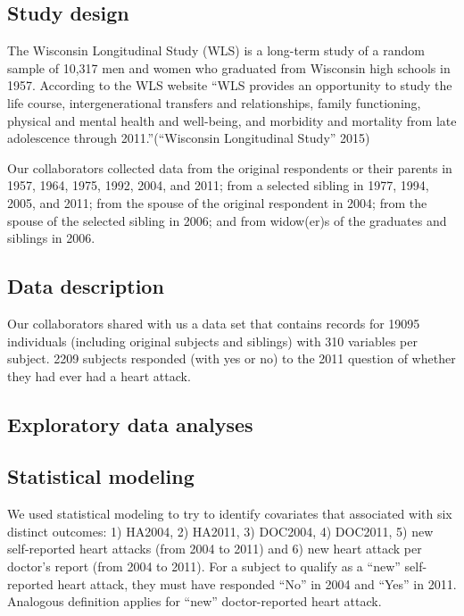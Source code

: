 \documentclass[11pt,]{article}
\begin{document}
\subsection{Study design}\label{study-design}

The Wisconsin Longitudinal Study (WLS) is a long-term study of a random
sample of 10,317 men and women who graduated from Wisconsin high schools
in 1957. According to the WLS website ``WLS provides an opportunity to
study the life course, intergenerational transfers and relationships,
family functioning, physical and mental health and well-being, and
morbidity and mortality from late adolescence through
2011.''(``Wisconsin Longitudinal Study'' 2015)


Our collaborators collected data from the original respondents or their
parents in 1957, 1964, 1975, 1992, 2004, and 2011; from a selected
sibling in 1977, 1994, 2005, and 2011; from the spouse of the original
respondent in 2004; from the spouse of the selected sibling in 2006; and
from widow(er)s of the graduates and siblings in 2006.

\subsection{Data description}\label{data-description}

Our collaborators shared with us a data set that contains records for
19095 individuals (including original subjects and siblings) with 310
variables per subject. 2209 subjects responded (with yes or no) to the
2011 question of whether they had ever had a heart attack.

\subsection{Exploratory data analyses}\label{exploratory-data-analyses}


\subsection{Statistical modeling}\label{statistical-modeling}

We used statistical modeling to try to identify covariates that
associated with six distinct outcomes: 1) HA2004, 2) HA2011, 3) DOC2004,
4) DOC2011, 5) new self-reported heart attacks (from 2004 to 2011) and
6) new heart attack per doctor's report (from 2004 to 2011). For a
subject to qualify as a ``new'' self-reported heart attack, they must
have responded ``No'' in 2004 and ``Yes'' in 2011. Analogous definition
applies for ``new'' doctor-reported heart attack.
\end{document}
